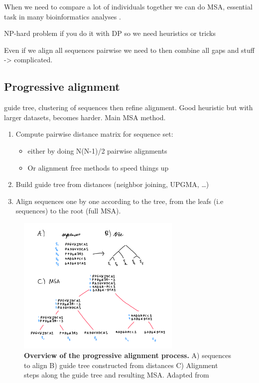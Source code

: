 \documentclass[
  11pt,
  twoside]{scrbook}
\providecommand{\tightlist}{%
  \setlength{\itemsep}{0pt}\setlength{\parskip}{0pt}}
\newcommand{\extcaption}[2]{
    \caption[#1]{
        \textbf{#1}\newline
        #2
    }
}
\begin{document}
When we need to compare a lot of individuals together we can do MSA, essential task in many bioinformatics analyses \autocite{russellMultipleSequenceAlignment2014}.

NP-hard \autocite{wangComplexityMultipleSequence1994,justComputationalComplexityMultiple2001} problem if you do it with DP so we need heuristics or tricks

Even if we align all sequences pairwise we need to then combine all gaps and stuff -\textgreater{} complicated.

\hypertarget{progressive-alignment}{%
\subsection{Progressive alignment}\label{progressive-alignment}}

guide tree, clustering of sequences then refine alignment. Good heuristic but with larger datasets, becomes harder. \autocite{fengProgressiveSequenceAlignment1987} Main MSA method.

\begin{enumerate}
\def\labelenumi{\arabic{enumi}.}
\tightlist
\item
  Compute pairwise distance matrix for sequence set:

  \begin{itemize}
  \item
    either by doing N(N-1)/2 pairwise alignments
  \item
    Or alignment free methods to speed things up \autocite{jonesRapidGenerationMutation1992,blaisdellMeasureSimilaritySets1986}
  \end{itemize}
\item
  Build guide tree from distances (neighbor joining, UPGMA, \ldots)
\item
  Align sequences one by one according to the tree, from the leafs (i.e sequences) to the root (full MSA).
\end{enumerate}

\begin{figure}[h]
\centering
\includegraphics[width=0.7\textwidth]{./figures/Align-Intro/progressive-aln.pdf}
\extcaption{Overview of the progressive alignment process.}{A) sequences to align B) guide tree constructed from distances C) Alignment steps along the guide tree and resulting MSA. Adapted from \autocite{sungAlgorithmsBioinformaticsPractical2011}}
\label{fig:progAlign}
\end{figure}
\end{document}
